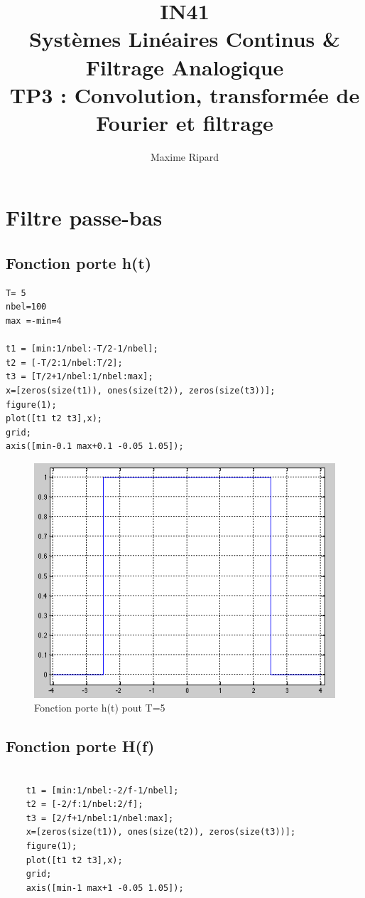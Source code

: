 \documentclass[a4paper, oneside]{report}
\title{IN41 \\Syst\`emes Lin\'eaires Continus \& Filtrage Analogique \\TP3 : Convolution, transform\'ee de Fourier et filtrage}
\author{Maxime Ripard}
\begin{document}
  \maketitle
  \newpage{}
  \tableofcontents
  \newpage{}

  \chapter{Filtre passe-bas}
    \section{Fonction porte h(t)}
    
\begin{lstlisting}
T= 5
nbel=100
max =-min=4 

t1 = [min:1/nbel:-T/2-1/nbel];
t2 = [-T/2:1/nbel:T/2];
t3 = [T/2+1/nbel:1/nbel:max];
x=[zeros(size(t1)), ones(size(t2)), zeros(size(t3))];
figure(1);
plot([t1 t2 t3],x);
grid;
axis([min-0.1 max+0.1 -0.05 1.05]);
\end{lstlisting}
  
  \begin{figure}[h]
   \centering
    \includegraphics[scale=0.75]{images/portet.png}
    \caption{Fonction porte h(t) pout T=5}
  \end{figure}
  
  \section{Fonction porte H(f)}
  
\begin{lstlisting}

	t1 = [min:1/nbel:-2/f-1/nbel];
	t2 = [-2/f:1/nbel:2/f];
	t3 = [2/f+1/nbel:1/nbel:max];
	x=[zeros(size(t1)), ones(size(t2)), zeros(size(t3))];
	figure(1);
	plot([t1 t2 t3],x);
	grid;
	axis([min-1 max+1 -0.05 1.05]);
\end{lstlisting}
  
\end{document}
